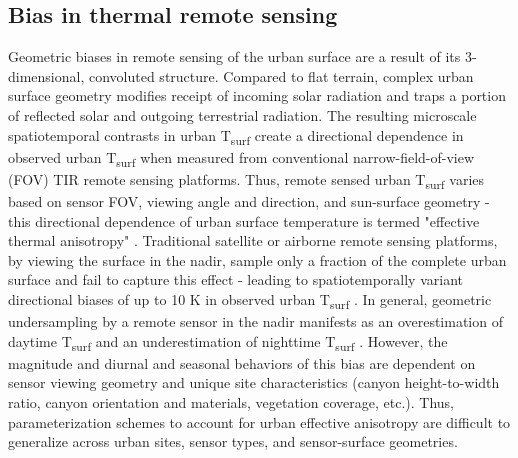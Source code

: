 \subsection{Bias in thermal remote sensing}
Geometric biases in remote sensing of the urban surface are a result of its 3-dimensional, convoluted structure. Compared to flat terrain, complex urban surface geometry modifies receipt of incoming solar radiation and traps a portion of reflected solar and outgoing terrestrial radiation. The resulting microscale spatiotemporal contrasts in urban T\textsubscript{surf} create a directional dependence in observed urban T\textsubscript{surf} when measured from conventional narrow-field-of-view (FOV) TIR remote sensing platforms. Thus, remote sensed urban T\textsubscript{surf} varies based on sensor FOV, viewing angle and direction, and sun-surface geometry - this directional dependence of urban surface temperature is termed "effective thermal anisotropy" \cite{Voogt1998a}. Traditional satellite or airborne remote sensing platforms, by viewing the surface in the nadir, sample only a fraction of the complete urban surface and fail to capture this effect - leading to spatiotemporally variant directional biases of up to 10 \si{\kelvin} in observed urban T\textsubscript{surf} \cite{Voogt1995}. In general, geometric undersampling by a remote sensor in the nadir manifests as an overestimation of daytime T\textsubscript{surf} and an underestimation of nighttime T\textsubscript{surf} \cite{Adderley2015}. However, the magnitude and diurnal and seasonal behaviors of this bias are dependent on sensor viewing geometry and unique site characteristics (canyon height-to-width ratio, canyon orientation and materials, vegetation coverage, etc.). Thus, parameterization schemes to account for urban effective anisotropy are difficult to generalize across urban sites, sensor types, and sensor-surface geometries.

